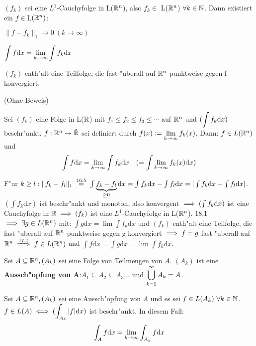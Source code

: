 \documentclass[a4paper,twoside,DIV15,BCOR12mm]{scrbook}
\begin{document}
\begin{satz}
$(f_k)$ sei eine $L^1$-Cauchyfolge in L($\mathbb{R}^n$), also $f_k\in$ L($\mathbb{R}^n$) $\forall k\in\mathbb{N}$. Dann existiert ein $f\in $L$(\mathbb{R}^n)$:
\begin{liste}
\item $\|f-f_k\|_1\to 0\ (k\to\infty)$
\item $\displaystyle\int f\text{d}x=\displaystyle\lim_{k\to\infty}\displaystyle\int f_k\text{d}x$
\item $(f_k)$ enth"alt eine Teilfolge, die fast "uberall auf $\mathbb{R}^n$ punktweise gegen f konvergiert.
\end{liste}
(Ohne Beweis)
\end{satz}

\begin{satz}
Sei $(f_k)$ eine Folge in L($\mathbb{R}$) mit $f_1\le f_2\le f_3\le \cdots$ auf $\mathbb{R}^n$ und $(\displaystyle\int f_k\text{d}x)$ beschr"ankt. $f:\mathbb{R}^n\to\tilde{\mathbb{R}}$ sei definiert durch $f(x):=\displaystyle\lim_{k\to\infty}f_k(x)$. Dann: $f\in L(\mathbb{R}^n)$ und
$$\displaystyle\int f\text{d}x=\displaystyle\lim_{k\to\infty}\displaystyle\int f_k\text{d}x\quad (=\displaystyle\int\displaystyle\lim_{k\to\infty} f_k(x)\text{d}x)$$
\end{satz}

\begin{beweis}
F"ur $k\ge l: \|f_k-f_l\|_1\gleichnach{16.5}\int\underbrace{f_k-f_l}_{\ge 0}\text{d}x=\int f_k\text{d}x-\int f_l\text{d}x=|\int f_k\text{d}x -\int f_l\text{d}x|$. $(\int f_k\text{d}x)$ ist beschr"ankt und monoton, also konvergent $\implies (\int f_k\text{d}x)$ ist eine Cauchyfolge in $\mathbb{R} \implies (f_k)$ ist eine $L^1$-Cauchyfolge in L($\mathbb{R}^n$). 18.1 $\implies \exists g\in L(\mathbb{R}^n)$ mit: $\int g\text{d}x=\lim\int f_k\text{d}x$ und $(f_k)$ enth"alt eine Teilfolge, die fast "uberall auf $\mathbb{R}^n$ punktweise gegen g konvergiert $\implies f=g$ fast "uberall auf $\MdR^n\folgtnach{17.7}f\in L(\MdR^n)$ und $\int f\text{d}x=\int g\text{d}x=\lim\int f_k\text{d}x$.
\end{beweis}

\begin{definition}
Sei $A\subseteq\mathbb{R}^n, (A_k)$ sei eine Folge von Teilmengen von $A$. $(A_k)$ ist eine \textbf{Aussch"opfung von A}:\equizu $A_1\subseteq A_2\subseteq A_3\ldots$ und $\displaystyle\bigcup_{k=1}^\infty A_k=A$.
\end{definition}

\begin{satz}
Sei $A\subseteq\mathbb{R}^n, (A_k)$ sei eine Aussch"opfung von $A$ und es sei $f\in L(A_k)\ \forall k\in\mathbb{N}$. $f\in L(A)\iff (\displaystyle\int_{A_k}|f|\text{d}x)$ ist beschr"ankt. In diesem Fall:
$$\displaystyle\int_A f\text{d}x=\displaystyle\lim_{k\to\infty}\displaystyle\int_{A_k}f\text{d}x$$
\end{satz}
\end{document}
